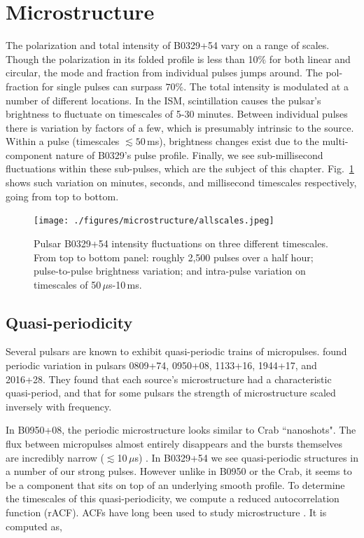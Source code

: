 \section{Microstructure}

The polarization and 
total intensity of B0329+54 vary on a range of scales. 
Though the polarization in its folded profile is less than 
10$\%$ for both linear and circular, the 
mode and fraction from individual pulses 
jumps around. The pol-fraction for single pulses 
can surpass $70\%$. The total intensity is modulated 
at a number of different locations.
In the ISM, scintillation causes the pulsar's brightness to fluctuate 
on timescales of 5-30 minutes. Between individual pulses there is  
variation by factors of a few, which is presumably intrinsic 
to the source. Within a pulse (timescales $\lesssim 50$\,ms), 
brightness changes exist due to the multi-component nature 
of B0329's pulse profile. Finally, 
we see sub-millisecond fluctuations within these sub-pulses, 
which are the subject of this chapter.
Fig.~\ref{fig-alltscales} shows such variation on 
minutes, seconds, and millisecond timescales respectively,
going from top to bottom.

\begin{figure}[!h]
\begin{center}
\texttt{[image: ./figures/microstructure/allscales.jpeg]}
\caption{Pulsar B0329+54 intensity fluctuations 
on three different timescales. From top to bottom panel: roughly 
2,500 pulses over a half hour; pulse-to-pulse brightness 
variation; and intra-pulse variation on timescales of 50\,$\mu$s-10\,ms.}
\vspace{-0.75cm}   
\label{fig-alltscales}
\end{center}
\end{figure} 

\subsection{Quasi-periodicity}

Several pulsars are known to exhibit quasi-periodic 
trains of micropulses. \citet{1990AJ....100.1882C} 
found periodic variation in pulsars 0809+74, 0950+08, 
1133+16, 1944+17, and 2016+28. They found that each 
source's microstructure had a characteristic quasi-period, 
and that for some pulsars the strength of microstructure 
scaled inversely with frequency. 

In B0950+08, the periodic microstructure 
looks similar to Crab ``nanoshots".
The flux between micropulses almost entirely disappears 
and the bursts themselves are incredibly narrow ($\lesssim$10\,$\mu$s)
\citep{2002ARep...46..206P}. 
In B0329+54 we see quasi-periodic structures in a 
number of our strong pulses. However unlike in B0950 or 
the Crab, it seems to be a component that sits on 
top of an underlying smooth profile. To determine the 
timescales of this quasi-periodicity, we compute 
a reduced autocorrelation function (rACF). ACFs
have long been used to study microstructure
\citep[see][]{1978AZh....55.1024K, 1998A&A...332..111L}. 
It is computed as,

